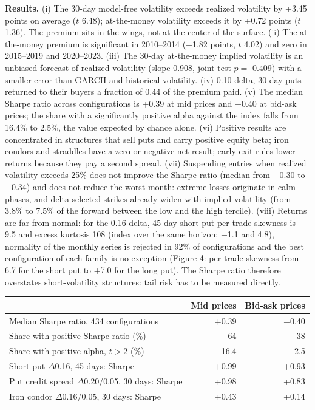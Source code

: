 \documentclass[11pt,a4paper]{article}
\begin{document}
\textbf{Results.} (i) The 30-day model-free volatility exceeds realized volatility by +3.45 points on average ($t$ 6.48); at-the-money volatility exceeds it by +0.72 points ($t$ 1.36). The premium sits in the wings, not at the center of the surface. (ii) The at-the-money premium is significant in 2010--2014 (+1.82 points, $t$ 4.02) and zero in 2015--2019 and 2020--2023. (iii) The 30-day at-the-money implied volatility is an unbiased forecast of realized volatility (slope 0.908, joint test $p=$ 0.409) with a smaller error than GARCH and historical volatility. (iv) 0.10-delta, 30-day puts returned to their buyers a fraction of 0.44 of the premium paid. (v) The median Sharpe ratio across configurations is +0.39 at mid prices and $-$0.40 at bid-ask prices; the share with a significantly positive alpha against the index falls from 16.4\% to 2.5\%, the value expected by chance alone. (vi) Positive results are concentrated in structures that sell puts and carry positive equity beta; iron condors and straddles have a zero or negative net result; early-exit rules lower returns because they pay a second spread. (vii) Suspending entries when realized volatility exceeds 25\% does not improve the Sharpe ratio (median from $-$0.30 to $-$0.34) and does not reduce the worst month: extreme losses originate in calm phases, and delta-selected strikes already widen with implied volatility (from 3.8\% to 7.5\% of the forward between the low and the high tercile). (viii) Returns are far from normal: for the 0.16-delta, 45-day short put per-trade skewness is $-$9.5 and excess kurtosis 108 (index over the same horizon: $-$1.1 and 4.8), normality of the monthly series is rejected in 92\% of configurations and the best configuration of each family is no exception (Figure 4: per-trade skewness from $-$6.7 for the short put to +7.0 for the long put). The Sharpe ratio therefore overstates short-volatility structures: tail risk has to be measured directly.

\begin{center}\small
\begin{tabular}{lrr}\toprule
 & Mid prices & Bid-ask prices \\ \midrule
Median Sharpe ratio, 434 configurations & +0.39 & $-$0.40 \\
Share with positive Sharpe ratio (\%) & 64 & 38 \\
Share with positive alpha, $t>2$ (\%) & 16.4 & 2.5 \\
Short put $\Delta$0.16, 45 days: Sharpe & +0.99 & +0.93 \\
Put credit spread $\Delta$0.20/0.05, 30 days: Sharpe & +0.98 & +0.83 \\
Iron condor $\Delta$0.16/0.05, 30 days: Sharpe & +0.43 & +0.14 \\
\bottomrule\end{tabular}
\end{center}
\end{document}
